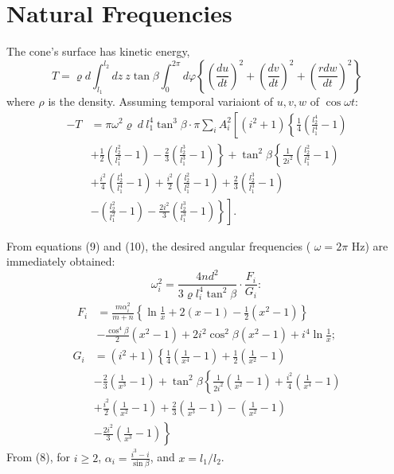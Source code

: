 \documentclass[11pt]{amsart}
\begin{document}
\section{Natural Frequencies}
The cone's surface has kinetic energy,
\[
T=\varrho d \int_{l_1}^{l_2} d z ~ z \tan \beta \int_0^{2 \pi} d \varphi\left\{\left(\frac{d u}{d t}\right)^2+\left(\frac{d v}{d t}\right)^2+\left(\frac{r d w}{d t}\right)^2\right\}
\]
where \(\rho\) is the density.  Assuming temporal variaiont of \(u,v,w\) of \(\cos \omega t\):
\begin{equation}\label{eq10p734}
\begin{aligned}
-T & = \pi \omega^2 \varrho ~ d ~ l_1^4 \tan^3 \beta \cdot \pi \sum_i A_i^2\left[( i ^ { 2 } + 1 ) \left\{\frac{1}{4}\left(\frac{l_2^4}{l_1^4}-1\right)\right.\right. \\
& \left.+\frac{1}{2}\left(\frac{l_2^2}{l_1^2}-1\right)-\frac{2}{3}\left(\frac{l_2^3}{l_1^3}-1\right)\right\}+\tan^2 \beta\left\{\frac{1}{2 i^2}\left(\frac{l_2^2}{l_1^2}-1\right)\right. \\
& +\frac{i^2}{4}\left(\frac{l_2^4}{l_1^4}-1\right)+\frac{i^2}{2}\left(\frac{l_2^2}{l_1^2}-1\right)+\frac{2}{3}\left(\frac{l_2^3}{l_1^3}-1\right) \\
& \left.\left.-\left(\frac{l_2^2}{l_1^2}-1\right)-\frac{2 i^2}{3}\left(\frac{l_2^3}{l_1^3}-1\right)\right\}\right] .
\end{aligned}
\end{equation}

From equations (9) and (10), the desired angular frequencies
( \(\omega=2 \pi\) Hz) are immediately obtained:
\begin{equation}\label{eq11p734}
\omega_i^2=\frac{4 n d^2}{3 \varrho l_i^4 \tan^2 \beta} \cdot \frac{F_i}{G_i}:
\end{equation}
\begin{equation}\label{eq12p734}
\begin{aligned}
F_i & =\frac{m \alpha_i^2}{m+n}\left\{\ln \frac{1}{x}+2(x-1)-\frac{1}{2}\left(x^2-1\right)\right\} \\
& -\frac{\cos ^4 \beta}{2}\left(x^2-1\right)+2 i^2 \cos ^2 \beta\left(x^2-1\right)+i^4 \ln \frac{1}{x} ;
\end{aligned}
\end{equation}
\begin{equation}\label{eq13p734}
\begin{aligned}
G_i & =\left(i^2+1\right)\left\{\frac{1}{4}\left(\frac{1}{x^4}-1\right)+\frac{1}{2}\left(\frac{1}{x^2}-1\right)\right. \\
& -\frac{2}{3}\left(\frac{1}{x^3}-1\right)+\tan^2 \beta\left\{\frac{1}{2 i^2}\left(\frac{1}{x^2}-1\right)+\frac{i^2}{4}\left(\frac{1}{x^4}-1\right)\right. \\
& +\frac{i^2}{2}\left(\frac{1}{x^2}-1\right)+\frac{2}{3}\left(\frac{1}{x^3}-1\right)-\left(\frac{1}{x^2}-1\right) \\
& \left.-\frac{2 i^2}{3}\left(\frac{1}{x^3}-1\right)\right\}
\end{aligned}
\end{equation}
From (8), for \(i\geq 2\), \(\alpha_i=\frac{i^3-i}{\sin \beta}\), and \(x=l_1/l_2\).
\end{document}
